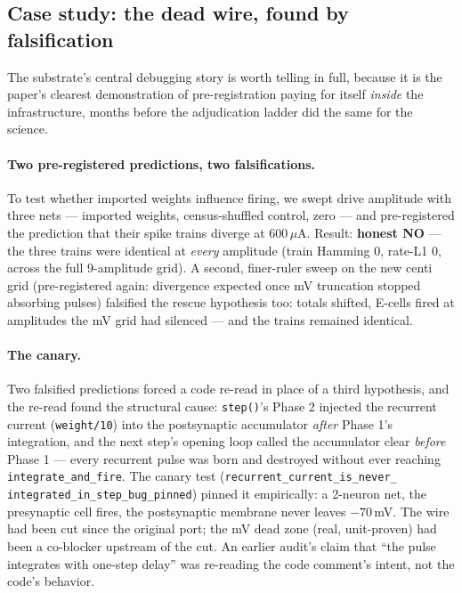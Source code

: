 \subsection{Case study: the dead wire, found by falsification}
\label{sec:deadwire}

The substrate's central debugging story is worth telling in full,
because it is the paper's clearest demonstration of
pre-registration paying for itself \emph{inside} the infrastructure,
months before the adjudication ladder did the same for the science.

\paragraph{Two pre-registered predictions, two falsifications.}
To test whether imported weights influence firing, we swept drive
amplitude with three nets --- imported weights, census-shuffled
control, zero --- and pre-registered the prediction that their spike
trains diverge at 600\,$\mu$A. Result: \textbf{honest NO} --- the
three trains were identical at \emph{every} amplitude (train Hamming
0, rate-L1 0, across the full 9-amplitude grid). A second, finer-ruler
sweep on the new centi grid (pre-registered again: divergence expected
once mV truncation stopped absorbing pulses) falsified the rescue
hypothesis too: totals shifted, E-cells fired at amplitudes the mV
grid had silenced --- and the trains remained identical.

\paragraph{The canary.}
Two falsified predictions forced a code re-read in place of a third
hypothesis, and the re-read found the structural cause:
\texttt{step()}'s Phase 2 injected the recurrent current
(\texttt{weight/10}) into the postsynaptic accumulator \emph{after}
Phase 1's integration, and the next step's opening loop called the
accumulator clear \emph{before} Phase 1 --- every recurrent pulse was
born and destroyed without ever reaching \texttt{integrate\_and\_fire}.
The canary test
(\texttt{recurrent\_current\_is\_never\_}\allowbreak
\texttt{integrated\_in\_}\allowbreak\texttt{step\_bug\_pinned})
pinned it empirically: a 2-neuron net, the presynaptic cell fires, the
postsynaptic membrane never leaves $-70$\,mV. The wire had been cut
since the original port; the mV dead zone (real, unit-proven) had been
a co-blocker upstream of the cut. An earlier audit's claim that
``the pulse integrates with one-step delay'' was re-reading the code
comment's intent, not the code's behavior.

